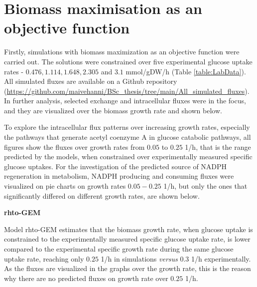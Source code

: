 \section{Biomass maximisation as an objective function}

Firstly, simulations with biomass maximization as an objective function were carried out. The solutions were constrained over five experimental glucose uptake rates - $0.476, 1.114, 1.648, 2.305$ and $3.1$ \unit{mmol/gDW/h} (Table \ref{table:LabData}).
All simulated fluxes are available on a Github repository (\url{https://github.com/maivehanni/BSc_thesis/tree/main/All_simulated_fluxes}). 
In further analysis, selected exchange and intracellular fluxes were in the focus, and they are visualized over the biomass growth rate and shown below.

To explore the intracellular flux patterns over increasing growth rates, especially the pathways that generate acetyl coenzyme A in glucose catabolic pathways, all figures show the fluxes over growth rates from $0.05$ to $0.25$ \unit{1/h}, that is the range predicted by the models, when constrained over experimentally measured specific glucose uptakes.
For the investigation of the predicted source of NADPH regeneration in metabolism, NADPH producing and consuming fluxes were visualized on pie charts on growth rates $0.05 - 0.25$ \unit{1/h}, but only the ones that significantly differed on different growth rates, are shown below. 

\textbf{rhto-GEM}



Model rhto-GEM estimates that the biomass growth rate, when glucose uptake is constrained to the experimentally measured specific glucose uptake rate, is lower compared to the experimental specific growth rate during the same glucose uptake rate, reaching only $0.25$ \unit{1/h} in simulations \textit{versus} $0.3$ \unit{1/h} experimentally. As the fluxes are visualized in the graphs over the growth rate, this is the reason why there are no predicted fluxes on growth rate over $0.25$ \unit{1/h}.  

